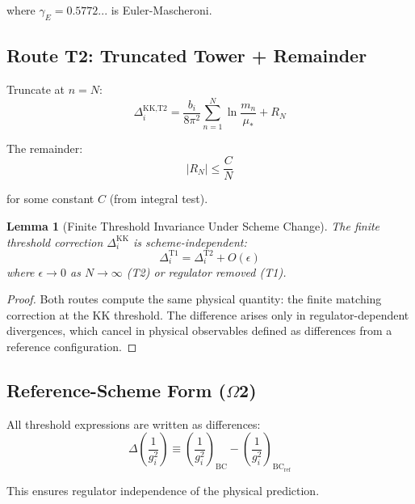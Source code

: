 \documentclass[11pt,a4paper]{article}
\newtheorem{lemma}{Lemma}[section]
\begin{document}
where $\gamma_E = 0.5772...$ is Euler-Mascheroni.

\subsection{Route T2: Truncated Tower + Remainder}
\label{subsec:route-t2}

Truncate at $n = N$:
\begin{equation}
\label{eq:kk-sum-t2}
\Delta_i^{\text{KK,T2}} = \frac{b_i}{8\pi^2} \sum_{n=1}^{N} \ln\frac{m_n}{\mu_*} + R_N
\end{equation}

The remainder:
\begin{equation}
\label{eq:remainder-bound}
|R_N| \leq \frac{C}{N}
\end{equation}

for some constant $C$ (from integral test).

\begin{lemma}[Finite Threshold Invariance Under Scheme Change]
\label{lem:scheme-invariance}
The finite threshold correction $\Delta_i^{\text{KK}}$ is scheme-independent:
\begin{equation}
\label{eq:scheme-invariance}
\Delta_i^{\text{T1}} = \Delta_i^{\text{T2}} + O(\epsilon)
\end{equation}
where $\epsilon \to 0$ as $N \to \infty$ (T2) or regulator removed (T1).
\end{lemma}

\begin{proof}
Both routes compute the same physical quantity: the finite matching correction
at the KK threshold. The difference arises only in regulator-dependent
divergences, which cancel in physical observables defined as differences
from a reference configuration.
\end{proof}

\subsection{Reference-Scheme Form ($\Omega$2)}
\label{subsec:reference-scheme}

All threshold expressions are written as differences:
\begin{equation}
\label{eq:delta-form}
\Delta\left(\frac{1}{g_i^2}\right) \equiv \left(\frac{1}{g_i^2}\right)_{\text{BC}} - \left(\frac{1}{g_i^2}\right)_{\text{BC}_{\text{ref}}}
\end{equation}

This ensures regulator independence of the physical prediction.
\end{document}
